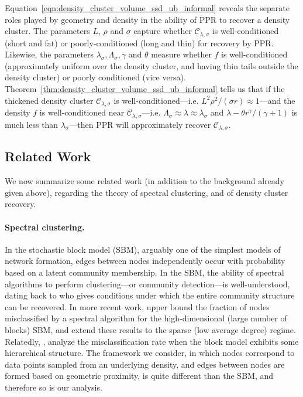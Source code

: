 \documentclass[11pt,twoside]{article}
\theoremstyle{definition}
\newcommand{\1}{\mathbf{1}}
\newcommand{\mc}[1]{\mathcal{#1}}
\begin{document}
Equation~\eqref{eqn:density_cluster_volume_ssd_ub_informal} reveals the separate roles played by geometry and density in the ability of PPR to recover a density cluster. The parameters $L$, $\rho$ and $\sigma$ capture whether $\mc{C}_{\lambda,\sigma}$ is well-conditioned (short and fat) or poorly-conditioned (long and thin) for recovery by PPR. Likewise, the parameters $\lambda_{\sigma}, \Lambda_{\sigma}, \gamma$ and $\theta$ measure whether $f$ is well-conditioned (approximately uniform over the density cluster, and having thin tails outside the density cluster) or poorly conditioned (vice versa). Theorem~\ref{thm:density_cluster_volume_ssd_ub_informal} tells us that if the thickened density cluster $\mc{C}_{\lambda,\sigma}$ is well-conditioned---i.e. $L^2\rho^2/(\sigma r) \approx 1$---and the density $f$ is well-conditioned near $\mc{C}_{\lambda,\sigma}$---i.e. $\Lambda_{\sigma} \approx \lambda \approx \lambda_{\sigma}$ and $\lambda - \theta r^{\gamma}/(\gamma + 1)$ is much less than $\lambda_{\sigma}$---then PPR will approximately recover $\mc{C}_{\lambda,\sigma}$.

\subsection{Related Work}
\label{subsec:related_work}
We now summarize some related work (in addition to the background already given above), regarding the theory of spectral clustering, and of density cluster recovery.

\paragraph{Spectral clustering.}
In the stochastic block model (SBM), arguably one of the simplest models of network formation, edges between nodes independently occur with probability based on a latent community membership. In the SBM, the ability of spectral algorithms to perform clustering---or community detection---is well-understood, dating 
back to \citet{mcsherry2001} who gives conditions under which the entire
community structure can be recovered. In more recent work, \citet{rohe2011}
upper bound the fraction of nodes misclassified by a spectral algorithm for the
high-dimensional (large number of blocks) SBM, and \citet{lei2015} extend these
results to the sparse (low average degree) regime. Relatedly,
\citet{clauset08,balakrishnan2011,li2018}, analyze the misclassification rate
when the block model exhibits some hierarchical structure. The framework we
consider, in which nodes correspond to data points sampled from an underlying 
density, and edges between nodes are formed based on geometric proximity, is
quite different than the SBM, and therefore so is our analysis.
\end{document}

